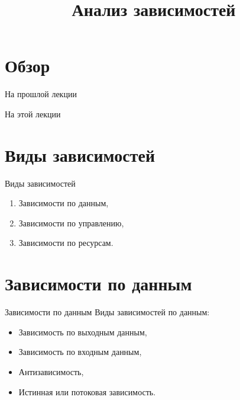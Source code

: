 

\title{Анализ зависимостей}



\begin{frame}
\titlepage
\end{frame}

\section*{Обзор}

\begin{frame}{На прошлой лекции}
\end{frame}

\begin{frame}{На этой лекции}
\tableofcontents
\end{frame} 

\section{Виды зависимостей}

\begin{frame}{Виды зависимостей}
\begin{enumerate}
    \item Зависимости по данным,
    \pause
    \item Зависимости по управлению,
    \pause
    \item Зависимости по ресурсам.
\end{enumerate}
\end{frame}

\section{Зависимости по данным}

\begin{frame}{Зависимости по данным}
Виды зависимостей по данным:

\begin{itemize}
    \item Зависимость по выходным данным,
    \item Зависимость по входным данным,
    \item Антизависимость,
    \item Истинная или потоковая зависимость.
\end{itemize}
\end{frame}

